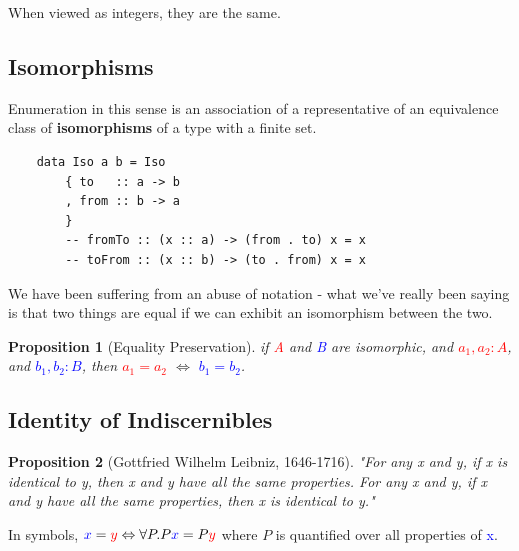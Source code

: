 \documentclass[tikz]{beamer}
\newcommand{\red}[1]{\textcolor{red}{#1}}
\newcommand{\mred}[1]{\textcolor{red}{$#1$}}
\newcommand{\blue}[1]{\textcolor{blue}{#1}}
\newcommand{\mblue}[1]{\textcolor{blue}{$#1$}}
\newcommand{\propnumber}{} %
\newtheorem*{prop}{Proposition \propnumber}
\theoremstyle{definition}
\begin{document}
\frame
{
	When viewed as integers, they are the same. 
}

\subsection{Isomorphisms}
\frame
{
	Enumeration in this sense is an association of a representative of an equivalence class of \textbf{isomorphisms} of a type with a finite set. 
}


\begin{frame}[fragile]

	\begin{verbatim}
	data Iso a b = Iso 
	    { to   :: a -> b
	    , from :: b -> a
	    }
	    -- fromTo :: (x :: a) -> (from . to) x = x
	    -- toFrom :: (x :: b) -> (to . from) x = x
	\end{verbatim}
\end{frame}

\frame
{
	We have been suffering from an abuse of notation - what we've really been saying is that two things are equal if we can exhibit an isomorphism between the two.
}

\frame
{ 
	\begin{prop}[Equality Preservation]
		if \red{A} and \blue{B} are isomorphic, and \mred{a_1, a_2 : A}, and \mblue{b_1, b_2 : B}, then \mred{a_1 = a_2} $\Leftrightarrow$ \mblue{b_1 = b_2}.
	\end{prop}
}

\subsection{Identity of Indiscernibles}
\frame
{

	\begin{prop}[Gottfried Wilhelm Leibniz, 1646-1716]
		"For any x and y, if x is identical to y, then x and y have all the same properties. For any x and y, if x and y have all the same properties, then x is identical to y."
	\end{prop}
	
}

\frame
{

	In symbols, $\blue{x} = \red{y} \Leftrightarrow \forall P. P \blue{x} = P \red{y}$ where $P$ is quantified over all properties of \blue{x}.
		
}
\end{document}
